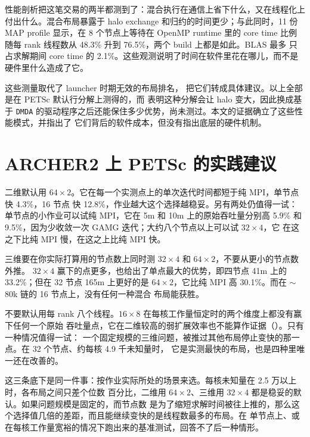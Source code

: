 \documentclass[11pt,a4paper,oneside]{report}
\begin{document}
性能剖析把这笔交易的两半都测到了：混合执行在通信上省下什么，又在线程化上付出什么。混合布局暴露于
halo exchange 和归约的时间更少；与此同时，11 份 MAP profile 显示，在 8 个节点上等待在 OpenMP
runtime 里的 core time 比例随每 rank 线程数从 48.3\% 升到 76.5\%，两个 build 上都是如此。BLAS 最多
只占求解期间 core time 的 2.1\%。这些观测说明了时间在软件里花在哪儿，而不是硬件里什么造成了它。

这些测量取代了 launcher 时期无效的布局排名， 把它们转成具体建议。以上全部是在
PETSc 默认行分解上测得的，而  表明这种分解会让 halo 变大，因此换成基于
\texttt{DMDA} 的驱动程序之后还能保住多少优势，尚未测过。本文的证据确立了这些性能模式，并指出了
它们背后的软件成本，但没有指出底层的硬件机制。

\section{ARCHER2 上 PETSc 的实践建议}
\label{sec:guidance}
二维默认用 $64\times2$。它在每一个实测点上的单次迭代时间都短于纯 MPI，单节点快 4.3\%，16 节点
快 12.8\%，作业越大这个选择越稳妥。另有两处仍值得一试：单节点的小作业可以试纯 MPI，它在 5m 和
10m 上的原始吞吐量分别高 5.9\% 和 9.5\%，因为少收敛一次 GAMG 迭代；大约八个节点以上可以试 $32\times4$，它
在这之下比纯 MPI 慢，在这之上比纯 MPI 快。

三维要在你实际打算用的节点数上同时测 $32\times4$ 和 $64\times2$，不要从更小的节点数外推。
$32\times4$ 赢下的点更多，也给出了单点最大的优势，即四节点 41m 上的 33.2\%；但在 32 节点 165m
上更好的是 $64\times2$，它比纯 MPI 高 30.1\%。而在 $\sim$80k 链的 16 节点上，没有任何一种混合
布局能获胜。

不要默认用每 rank 八个线程。$16\times8$ 在每核工作量恒定时的两个维度上都没有赢下任何一个原始
吞吐量点，它在二维较高的弱扩展效率也不能算作证据（）。只有一种情况值得一试：
一个固定规模的三维问题，被推过其他布局停止变快的那一点。在 32 个节点、约每核 4.9 千未知量时，
它是实测最快的布局，也是四种里唯一还在改善的。

这三条底下是同一件事：按作业实际所处的场景来选。每核未知量在 2.5 万以上时，各布局之间只差个位数
百分比，二维用 $64\times2$、三维用 $32\times4$ 都是稳妥的默认。如果问题规模是固定的，而节点数
是为了缩短求解时间被往上推的，那么这个选择值几倍的差距，而且能继续变快的是线程数最多的布局。在
单节点上、或在每核工作量宽裕的情况下跑出来的基准测试，回答不了后一种情形。
\end{document}

